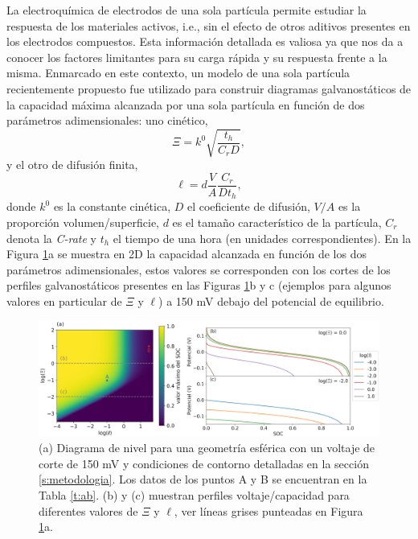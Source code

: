 La electroquímica de electrodos de una sola partícula \cite{ventosa2021, 
heubner2020, takahashi2020, wahab2020, xu2020, tao2019, fukui2011} permite 
estudiar la respuesta  de los materiales activos, i.e., sin el efecto 
de otros aditivos presentes en los electrodos compuestos. Esta información 
detallada es valiosa ya que nos da a conocer los factores limitantes para su 
carga rápida y su respuesta frente a la misma. Enmarcado en este contexto, un 
modelo de una sola partícula recientemente propuesto \cite{gavilan2023} fue 
utilizado para construir diagramas galvanostáticos de la capacidad máxima 
alcanzada por una sola partícula en función de dos parámetros adimensionales: uno
cinético,
\begin{equation}\label{eq:xi}
    \Xi = k^0 \sqrt{\frac{t_h}{C_r D}},
\end{equation}
y el otro de difusión finita,
\begin{equation}\label{eq:ele}
    \ell = d \frac{V}{A} \frac{C_r}{D t_h},
\end{equation}
donde $k^0$ es la constante cinética, $D$ el coeficiente de difusión, $V/A$ es la 
proporción volumen/superficie, $d$ es el tamaño característico de la partícula, 
$C_r$ denota la \textit{C-rate} y $t_h$ el tiempo de una hora (en unidades 
correspondientes). En la Figura \ref{fig:diagnostico}a se muestra en 2D la 
capacidad alcanzada en función de los dos parámetros adimensionales, estos valores 
se corresponden con los cortes de los perfiles galvanostáticos presentes en las
Figuras \ref{fig:diagnostico}b y c (ejemplos para algunos valores en particular 
de $\Xi$ y $\ell$) a 150 mV debajo del potencial de equilibrio.

\begin{figure}[h!]
    \centering
    \includegraphics[width=\textwidth]{FastCharging/un/introduccion/diagnosis-merged.png}
    \caption{(a) Diagrama de nivel para una geometría esférica con un voltaje de 
    corte de 150 mV y condiciones de contorno detalladas en la sección 
    \ref{s:metodologia}. Los datos de los puntos A y B se encuentran en la 
    Tabla \ref{t:ab}. (b) y (c) muestran perfiles voltaje/capacidad para 
    diferentes valores de $\Xi$ y $\ell$, ver líneas grises punteadas en 
    Figura \ref{fig:diagnostico}a.}
    \label{fig:diagnostico}
\end{figure}


